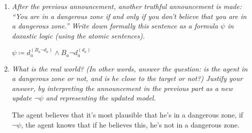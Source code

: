 \documentclass[leqno]{article}
\begin{document}
\begin{enumerate}
    \begin{center}
    \end{center}

    \item \textit{After the previous announcement, another truthful
    announcement is made: “You are in a dangerous zone if and only if you don’t
    believe that you are in a dangerous zone.” Write down formally this
    sentence as a formula $\psi$ in doxastic logic (using the atomic
    sentences).}

    $\psi \coloneqq d_a^{(B_a \neg d_a)} \wedge B_a \neg d_a^{(d_a)}$

    \item \textit{What is the real world? (In other words, answer the question:
    is the agent in a dangerous zone or not, and is he close to the target or
    not?) Justify your answer, by interpreting the announcement in the previous
    part as a new update $\neg \psi$ and representing the updated model.}

    The agent believes that it's most plausible that he's in a dangerous zone,
    if $\neg \psi$, the agent knows that if he believes this, he's not in a
    dangerous zone.

    \begin{center}
    \end{center}

\end{enumerate}
\end{document}
